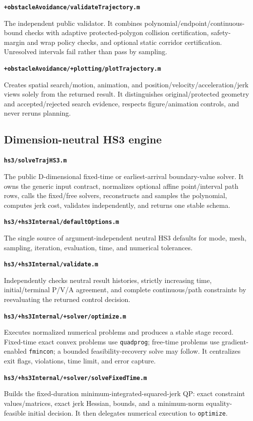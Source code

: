 \documentclass[10pt,letterpaper]{article}
\newcommand{\file}[1]{\nolinkurl{#1}}
\newcommand{\scriptentry}[2]{%
  \par\medskip\noindent\textbf{\file{#1}}\par
  \begingroup\raggedright #2\par\endgroup
}
\begin{document}
\scriptentry{+obstacleAvoidance/validateTrajectory.m}{The independent public
validator. It combines polynomial/endpoint/continuous-bound checks with
adaptive protected-polygon collision certification, safety-margin and wrap
policy checks, and optional static corridor certification. Unresolved intervals
fail rather than pass by sampling.}

\scriptentry{+obstacleAvoidance/+plotting/plotTrajectory.m}{Creates spatial
search/motion, animation, and position/velocity/acceleration/jerk views solely
from the returned result. It distinguishes original/protected geometry and
accepted/rejected search evidence, respects figure/animation controls, and
never reruns planning.}

\subsection{Dimension-neutral HS3 engine}

\scriptentry{hs3/solveTrajHS3.m}{The public D-dimensional fixed-time or
earliest-arrival boundary-value solver. It owns the generic input contract,
normalizes optional affine point/interval path rows, calls the fixed/free
solvers, reconstructs and samples the polynomial, computes jerk cost, validates
independently, and returns one stable schema.}

\scriptentry{hs3/+hs3Internal/defaultOptions.m}{The single source of
argument-independent neutral HS3 defaults for mode, mesh, sampling, iteration,
evaluation, time, and numerical tolerances.}

\scriptentry{hs3/+hs3Internal/validate.m}{Independently checks neutral result
histories, strictly increasing time, initial/terminal P/V/A agreement, and
complete continuous/path constraints by reevaluating the returned control
decision.}

\scriptentry{hs3/+hs3Internal/+solver/optimize.m}{Executes normalized numerical
problems and produces a stable stage record. Fixed-time exact convex problems
use \file{quadprog}; free-time problems use gradient-enabled \file{fmincon}; a
bounded feasibility-recovery solve may follow. It centralizes exit flags,
violations, time limit, and error capture.}

\scriptentry{hs3/+hs3Internal/+solver/solveFixedTime.m}{Builds the fixed-duration
minimum-integrated-squared-jerk QP: exact constraint values/matrices, exact jerk
Hessian, bounds, and a minimum-norm equality-feasible initial decision. It then
delegates numerical execution to \file{optimize}.}
\end{document}

